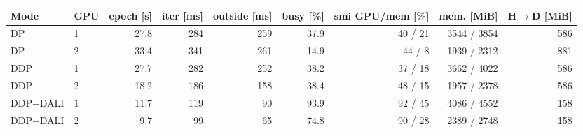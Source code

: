 \footnotesize\setlength{\tabcolsep}{4pt}
\begin{tabular}{@{}llrrrrrrr@{}}
\toprule
Mode & GPU & epoch [s] & iter [ms] & outside [ms] & busy [\%] & smi GPU/mem [\%] & mem. [MiB] & H$\to$D [MiB] \\
\midrule
DP       & 1 & 27.8 & 284 & 259 & 37.9 & 40 / 21 & 3544 / 3854 & 586 \\
DP       & 2 & 33.4 & 341 & 261 & 14.9 & 44 / 8  & 1939 / 2312 & 881 \\
DDP      & 1 & 27.7 & 282 & 252 & 38.2 & 37 / 18 & 3662 / 4022 & 586 \\
DDP      & 2 & 18.2 & 186 & 158 & 38.4 & 48 / 15 & 1957 / 2378 & 586 \\
DDP+DALI & 1 & 11.7 & 119 &  90 & 93.9 & 92 / 45 & 4086 / 4552 & 158 \\
DDP+DALI & 2 &  9.7 &  99 &  65 & 74.8 & 90 / 28 & 2389 / 2748 & 158 \\
\bottomrule
\end{tabular}
